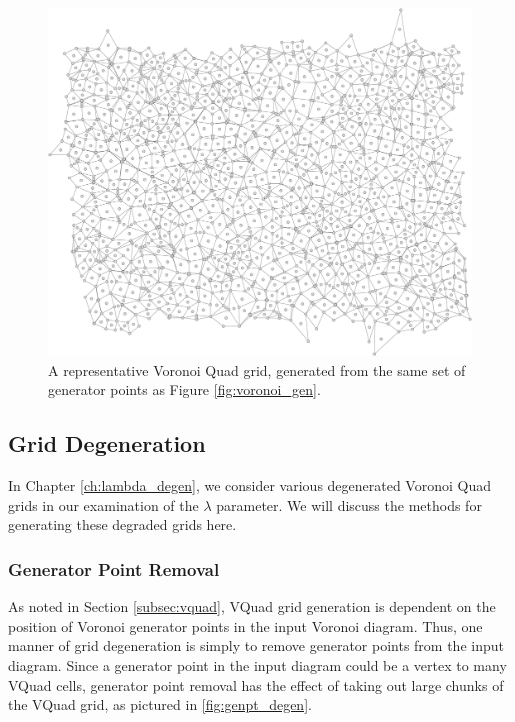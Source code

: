 \documentclass[a4paper,11pt]{report}
\begin{document}
\begin{figure}[htp]
\centering
\includegraphics[width=1.0\textwidth]{vquad_stoma_v2}
\caption[Voronoi Quad Grid]{
  A representative Voronoi Quad grid, generated from the same set of generator points as Figure 
  \ref{fig:voronoi_gen}.
}
\label{fig:vquad_grid}
\end{figure}

\subsection{Grid Degeneration}
In Chapter \ref{ch:lambda_degen}, we consider various degenerated Voronoi Quad grids
in our examination of the $\lambda$ parameter. We will discuss the methods for generating these degraded grids here.

\subsubsection{Generator Point Removal}
As noted in Section \ref{subsec:vquad}, VQuad grid generation is dependent on the position of Voronoi generator points in the input Voronoi diagram. Thus, one manner of grid degeneration is simply to remove generator points from the input diagram. Since a generator point in the input diagram could be a vertex to many VQuad cells, generator point removal has the effect of taking out large chunks of the VQuad grid, as pictured in \ref{fig:genpt_degen}.
\end{document}
